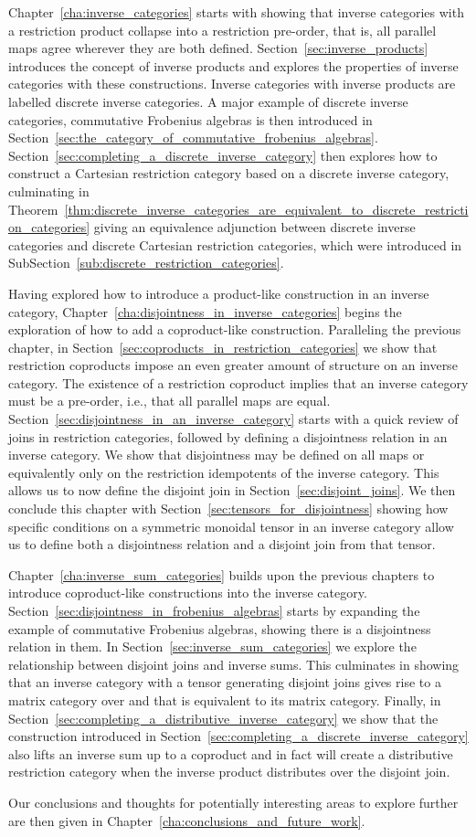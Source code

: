 Chapter~\ref{cha:inverse_categories} starts with showing that inverse categories with a restriction
product collapse into a restriction pre-order, that is, all parallel maps agree wherever they are
both defined. Section~\ref{sec:inverse_products} introduces the concept of inverse products and
explores the properties of inverse categories with these constructions. Inverse categories with
inverse products are labelled discrete inverse categories. A major example of discrete inverse
categories, commutative Frobenius algebras is then introduced in
Section~\ref{sec:the_category_of_commutative_frobenius_algebras}.
Section~\ref{sec:completing_a_discrete_inverse_category} then explores how to construct a Cartesian
restriction category based on a discrete inverse category, culminating in
Theorem~\ref{thm:discrete_inverse_categories_are_equivalent_to_discrete_restriction_categories}
giving an equivalence adjunction between discrete inverse categories and discrete Cartesian
restriction categories, which were introduced in SubSection~\ref{sub:discrete_restriction_categories}.

Having explored how to introduce a product-like construction in an inverse category,
Chapter~\ref{cha:disjointness_in_inverse_categories} begins the exploration of how to add a
coproduct-like construction. Paralleling the previous chapter, in
Section~\ref{sec:coproducts_in_restriction_categories} we show that restriction coproducts
impose an even greater amount of structure on an inverse category. The existence of a restriction
coproduct implies that an inverse category must be a pre-order, i.e., that all parallel maps are
equal. Section~\ref{sec:disjointness_in_an_inverse_category} starts with a quick review of joins in
restriction categories, followed by defining a disjointness relation in an inverse category. We show
that disjointness may be defined on all maps or equivalently only on the restriction idempotents of
the inverse category. This allows us to now define the disjoint join in
Section~\ref{sec:disjoint_joins}. We then conclude this chapter with
Section~\ref{sec:tensors_for_disjointness} showing how specific conditions on a symmetric monoidal
tensor in an inverse category allow us to define both a disjointness relation and a disjoint join
from that tensor.

Chapter~\ref{cha:inverse_sum_categories} builds upon the previous chapters to introduce
coproduct-like constructions into the inverse
category. Section~\ref{sec:disjointness_in_frobenius_algebras} starts by expanding the example of
commutative Frobenius algebras, showing there is a disjointness relation in them. In
Section~\ref{sec:inverse_sum_categories} we explore the relationship between disjoint joins and
inverse sums. This culminates in showing that an inverse category \X with a tensor generating disjoint
joins gives rise to a matrix category over \X and that \X is equivalent to its matrix
category. Finally, in Section~\ref{sec:completing_a_distributive_inverse_category} we show that the
construction introduced in Section~\ref{sec:completing_a_discrete_inverse_category} also lifts an
inverse sum up to a coproduct and in fact will create a distributive restriction category when the
inverse product distributes over the disjoint join.

Our conclusions and thoughts for potentially interesting areas to explore further are then given in
Chapter~\ref{cha:conclusions_and_future_work}.



